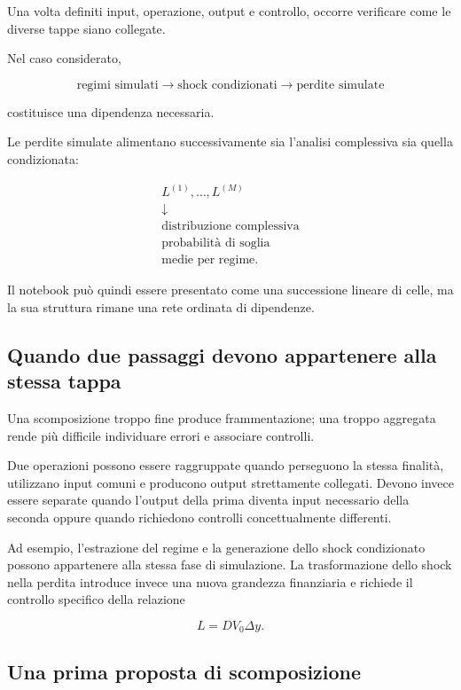 Una volta definiti input, operazione, output e controllo, occorre verificare
come le diverse tappe siano collegate.

Nel caso considerato,

\[
\text{regimi simulati}
\longrightarrow
\text{shock condizionati}
\longrightarrow
\text{perdite simulate}
\]

\noindent costituisce una dipendenza necessaria.

Le perdite simulate alimentano successivamente sia l'analisi complessiva sia
quella condizionata:

\[
\begin{array}{c}
L^{(1)},\ldots,L^{(M)}
\\[3pt]
\downarrow
\\[3pt]
\text{distribuzione complessiva}
\\
\text{probabilit\`{a} di soglia}
\\
\text{medie per regime}.
\end{array}
\]

Il notebook pu\`{o} quindi essere presentato come una successione lineare di
celle, ma la sua struttura rimane una rete ordinata di dipendenze.

\subsection{Quando due passaggi devono appartenere alla stessa tappa}

Una scomposizione troppo fine produce frammentazione; una troppo aggregata
rende pi\`{u} difficile individuare errori e associare controlli.

Due operazioni possono essere raggruppate quando perseguono la stessa
finalit\`{a}, utilizzano input comuni e producono output strettamente
collegati. Devono invece essere separate quando l'output della prima diventa
input necessario della seconda oppure quando richiedono controlli
concettualmente differenti.

Ad esempio, l'estrazione del regime e la generazione dello shock condizionato
possono appartenere alla stessa fase di simulazione. La trasformazione dello
shock nella perdita introduce invece una nuova grandezza finanziaria e
richiede il controllo specifico della relazione

\[
L=D V_0\Delta y.
\]

\subsection{Una prima proposta di scomposizione}

